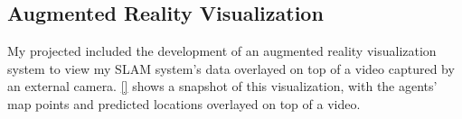 \subsection{Augmented Reality Visualization}
\label{sec:augmented-reality-visualization}

My projected included the development of an augmented reality visualization system to view my SLAM system's data overlayed on top of a video captured by an external camera. \autoref{} shows a snapshot of this visualization, with the agents' map points and predicted locations overlayed on top of a video.